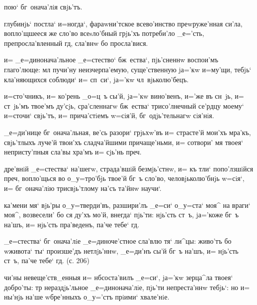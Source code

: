 
       пою` бг~онача'лiя свjь'тъ. 


  глубинjь` постла` и=ногда`, 
фараwни'тское всево'инство преwруже'нная си'ла, 
вопло'щшееся же сло'во всеsло'бный грjь'хъ потреби'ло 
_е='сть, препросла'вленный гд, сла'внw бо просла'вися.

 и= _е=динонача'льное _е=стество` 
бж~ества`, пjь'сненнw воспои'мъ глаго'люще: мл 
пучи'ну неизчерпа'емую, суще'ственную jа='кw и=му'щи, 
тебjь` кла'няющихся соблюди` и= сп~си`, jа='кw 
чл~вjьколю'бецъ.

 и=сто'чникъ, и= ко'рень _о=ц~ъ сы'й, jа='кw 
вино'венъ, и='же въ сн~jь, и= ст~jь'мъ твое'мъ ду'сjь, 
сра'сленнагw бж~ества` трисо'лнечный се'рдцу моему` 
и=сточи` свjь'тъ, и= прича'стiемъ w=сiя'й, 
бг~одjь'тельнагw сiя'нiя.

  _е=ди'нице бг~онача'льная, 
ве'сь разори` грjьхw'въ и= страсте'й мои'хъ мра'къ, 
свjь'тлыхъ луче'й твои'хъ сладча'йшими причаще'ньми, и= 
сотвори' мя твоея` непристу'пныя сла'вы хра'мъ и= сjь'нь 
преч.

  дре'внiй _е=стества` на'шегw, 
страда'вшiй безмjь'стнw, и= къ тли` попо'лзшiйся 
преч, вопло'щься во о_у=тро'бjь твое'й бг~ъ сло'во, 
человjьколю'бнjь w=сiя`, и= бг~онача'лiю трисвjь'тлому 
на'съ та'йнw научи`.


  ка'мени мя` вjь'ры о_у=тверди'въ, 
разшири'лъ _е=си` о_у=ста` моя^ на враги` моя^, 
возвесели' бо ся ду'хъ мо'й, внегда` пjь'ти: нjь'сть 
ст~ъ, jа='коже бг~ъ на'шъ, и= нjь'сть пра'веденъ, па'че 
тебе` гд.

 _е=стества` бг~онача'лiе 
_е=диноче'стное сла'влю тя` ли^цы: живо'тъ бо w\т живота` 
ты` произше'дъ нетлjь'ннw, _е=ди'нъ сы'й бг~ъ на'шъ, и= 
нjь'сть ст~ъ, па'че тебе` гд. (с. 206)

 чи'ны невеще'ств_енныя и= нб соста'вилъ 
_е=си`, jа='кw зерца^ла твоея` добро'ты: тр 
нераздjь'льное _е=динонача'лiе, пjь'ти непреста'ннw 
тебjь`: но и= ны'нjь на'ше w\т бре'нныхъ о_у='стъ прiими` 
хвале'нiе.

